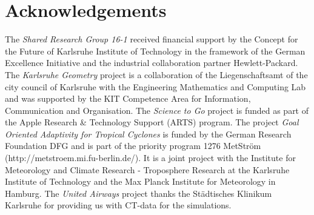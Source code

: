 \section*{Acknowledgements}

The \emph{Shared Research Group 16-1} received financial support by
the Concept for the Future of Karlsruhe Institute of Technology in the
framework of the German Excellence Initiative and the industrial
collaboration partner Hewlett-Packard. The \emph{Karlsruhe Geometry}
project is a collaboration of the Liegenschaftsamt of the city council
of Karlsruhe with the Engineering Mathematics and Computing Lab and
was supported by the KIT Competence Area for Information,
Communication and Organisation. The \emph{Science to Go} project is
funded as part of the Apple Research \& Technology Support (ARTS)
program. The project \emph{Goal Oriented Adaptivity for Tropical Cyclones} is
funded by the German Research Foundation DFG and is part of the
priority program 1276 MetStr\"om (http://metstroem.mi.fu-berlin.de/). It is a joint project with the
Institute for Meteorology and Climate Research - Troposphere
Research at the Karlsruhe Institute of Technology and the Max Planck
Institute for Meteorology in Hamburg. The \emph{United Airways}
project thanks the St\"adtisches Klinikum Karlsruhe for providing us
with CT-data for the simulations.
